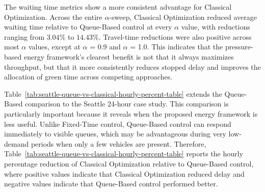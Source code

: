 \documentclass[12pt]{article}
\begin{document}
The waiting time metrics show a more consistent advantage for Classical Optimization. Across the entire $\alpha$-sweep, Classical Optimization reduced average waiting time relative to Queue-Based control at every $\alpha$ value, with reductions ranging from $3.04\%$ to $14.43\%$. Travel-time reductions were also positive across most $\alpha$ values, except at $\alpha$ = 0.9 and $\alpha$ = 1.0. This indicates that the pressure-based energy framework’s clearest benefit is not that it always maximizes throughput, but that it more consistently reduces stopped delay and improves the allocation of green time across competing approaches.

Table~\ref{tab:seattle-queue-vs-classical-hourly-percent-table} extends the Queue-Based comparison to the Seattle 24-hour case study. This comparison is particularly important because it reveals when the proposed energy framework is less useful. Unlike Fixed-Time control, Queue-Based control can respond immediately to visible queues, which may be advantageous during very low-demand periods when only a few vehicles are present. Therefore, Table~\ref{tab:seattle-queue-vs-classical-hourly-percent-table} reports the hourly percentage reduction of Classical Optimization relative to Queue-Based control, where positive values indicate that Classical Optimization reduced delay and negative values indicate that Queue-Based control performed better.
\end{document}

